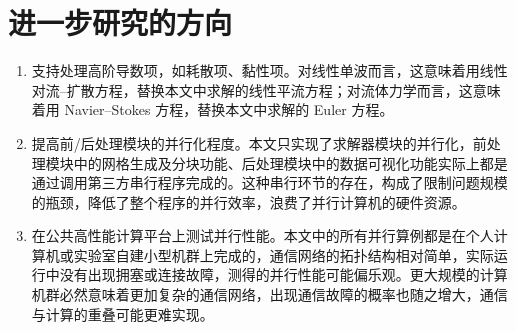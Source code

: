 \section*{进一步研究的方向}
\begin{enumerate}[wide]
\item 支持处理高阶导数项，如耗散项、黏性项。对线性单波而言，这意味着用线性对流–扩散方程，替换本文中求解的线性平流方程；对流体力学而言，这意味着用
Navier–Stokes 方程，替换本文中求解的 Euler 方程。 
\item 提高前/后处理模块的并行化程度。本文只实现了求解器模块的并行化，前处理模块中的网格生成及分块功能、后处理模块中的数据可视化功能实际上都是通过调用第三方串行程序完成的。这种串行环节的存在，构成了限制问题规模的瓶颈，降低了整个程序的并行效率，浪费了并行计算机的硬件资源。
\item 在公共高性能计算平台上测试并行性能。本文中的所有并行算例都是在个人计算机或实验室自建小型机群上完成的，通信网络的拓扑结构相对简单，实际运行中没有出现拥塞或连接故障，测得的并行性能可能偏乐观。更大规模的计算机群必然意味着更加复杂的通信网络，出现通信故障的概率也随之增大，通信与计算的重叠可能更难实现。
\end{enumerate}

